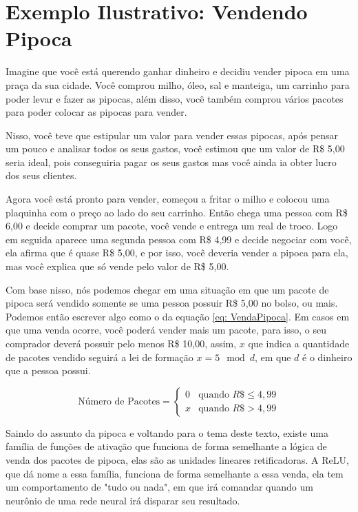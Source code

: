 
\section{Exemplo Ilustrativo: Vendendo Pipoca}

Imagine que você está querendo ganhar dinheiro e decidiu vender pipoca em uma praça da sua cidade. Você comprou milho, óleo, sal e manteiga, um carrinho para poder levar e fazer as pipocas, além disso, você também comprou vários pacotes para poder colocar as pipocas para vender.

Nisso, você teve que estipular um valor para vender essas pipocas, após pensar um pouco e analisar todos os seus gastos, você estimou que um valor de R\$ 5,00 seria ideal, pois conseguiria pagar os seus gastos mas você ainda ia obter lucro dos seus clientes.

Agora você está pronto para vender, começou a fritar o milho e colocou uma plaquinha com o preço ao lado do seu carrinho. Então chega uma pessoa com R\$ 6,00 e decide comprar um pacote, você vende e entrega um real de troco. Logo em seguida aparece uma segunda pessoa com R\$ 4,99 e decide negociar com você, ela afirma que é quase R\$ 5,00, e por isso, você deveria vender a pipoca para ela, mas você explica que só vende pelo valor de R\$ 5,00.

Com base nisso, nós podemos chegar em uma situação em que um pacote de pipoca será vendido somente se uma pessoa possuir R\$ 5,00 no bolso, ou mais. Podemos então escrever algo como o da equação \ref{eq: VendaPipoca}. Em casos em que uma venda ocorre, você poderá vender mais um pacote, para isso, o seu comprador deverá possuir pelo menos R\$ 10,00, assim, $x$ que indica a quantidade de pacotes vendido seguirá a lei de formação $x = 5 \mod d$, em que $d$ é o dinheiro que a pessoa possui.

\begin{equation}
    \text{Número de Pacotes} = \begin{cases} 0 & \text{quando } R\$ \leq  4,99 \\ x & \text{quando } R\$ > 4,99 \end{cases}
    \label{eq: VendaPipoca}
\end{equation}

Saindo do assunto da pipoca e voltando para o tema deste texto, existe uma família de funções de ativação que funciona de forma semelhante a lógica de venda dos pacotes de pipoca, elas são as unidades lineares retificadoras. A ReLU, que dá nome a essa família, funciona de forma semelhante a essa venda, ela tem um comportamento de "tudo ou nada", em que irá comandar quando um neurônio de uma rede neural irá disparar seu resultado.

